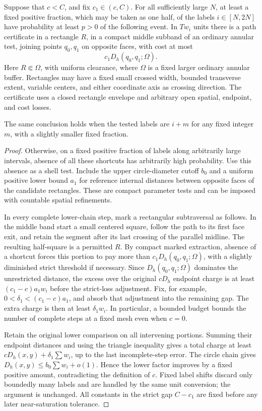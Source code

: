 \begin{lemma}\label{metric:shortcut-supply}
Suppose that $c<C$, and fix $c_1\in(c,C)$. For all sufficiently large $N$, at
least a fixed positive fraction, which may be taken as one half, of the
labels $i\in[N,2N]$ have probability at least $p>0$ of the following event.
In $Tw_i$ units there is a path certificate in a rectangle $R$, in a compact
middle subband of an ordinary annular test, joining points $q_0,q_1$ on
opposite faces, with cost at most
\[
 c_1D_h(q_0,q_1;\Omega).
\]
Here $R\Subset\Omega$, with uniform clearance, where $\Omega$ is a fixed
larger ordinary annular buffer. Rectangles may have a fixed small crossed
width, bounded transverse extent, variable centers, and either coordinate
axis as crossing direction. The certificate uses a closed rectangle
envelope and arbitrary open spatial, endpoint, and cost losses.

The same conclusion holds when the tested labels are $i+m$ for any fixed
integer $m$, with a slightly smaller fixed fraction.
\end{lemma}

\begin{proof}
Otherwise, on a fixed positive fraction of labels along arbitrarily large
intervals, absence of all these shortcuts has arbitrarily high probability.
Use this absence as a shell test. Include the upper circle-diameter cutoff
$b_0$ and a uniform positive lower bound $a_1$ for reference internal distances
between opposite faces of the candidate rectangles. These are compact
parameter tests and can be imposed with countable spatial refinements.

In every complete lower-chain step, mark a rectangular subtraversal as
follows. In the middle band start a small centered square, follow the path
to its first face exit, and retain the segment after its last crossing of
the parallel midline. The resulting half-square is a permitted $R$.
By compact marked extraction, absence of a shortcut forces this portion
to pay more than $c_1D_h(q_0,q_1;\Omega)$, with a slightly diminished strict
threshold if necessary. Since $D_h(q_0,q_1;\Omega)$ dominates the unrestricted
distance, the excess over the original \(cD_h\) endpoint charge is
at least \((c_1-c)a_1w_i\) before the strict-loss adjustment. Fix, for
example, \(0<\delta_1<(c_1-c)a_1\), and absorb that adjustment into the
remaining gap. The extra charge is then at least \(\delta_1w_i\). In particular, a bounded budget
bounds the number of complete steps at a fixed mesh even when $c=0$.

Retain the original lower comparison on all intervening portions. Summing
their endpoint distances and using the triangle inequality gives a total
charge at least $cD_h(x,y)+\delta_1\sum w_i$, up to the last incomplete-step
error. The circle chain gives
$D_h(x,y)\le b_0\sum w_i+o(1)$. Hence the lower factor improves by a fixed
positive amount, contradicting the definition of $c$. Fixed label shifts
discard only boundedly many labels and are handled by the same unit
conversion; the argument is unchanged. All constants in the strict gap
$C-c_1$ are fixed before any later near-saturation tolerance.
\end{proof}

